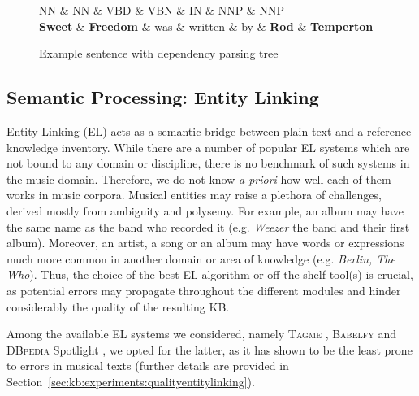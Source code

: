 \begin{figure}[!htb]
\centering
\begin{dependency}
\begin{deptext}[column sep=.0cm]
NN \& NN \& VBD \& VBN \& IN \& NNP \& NNP \\
\textbf{Sweet} \& \textbf{Freedom} \& was \& written \& by \& \textbf{Rod} \& \textbf{Temperton} \\
\end{deptext}




\end{dependency}
\vspace*{-5mm}
\caption{Example sentence with dependency parsing tree}
\label{fig:kb:sampletree}
\end{figure}


\subsection{Semantic Processing: Entity Linking}
\label{sec:kb:method:entitylinking}

Entity Linking (\textsc{EL}) acts as a semantic bridge between plain text and a reference knowledge inventory. While there are a number of popular \textsc{EL} systems which are not bound to any domain or discipline, there is no benchmark of such systems in the music domain. Therefore, we do not know \textit{a priori} how well each of them works in music corpora. Musical entities may raise a plethora of challenges, derived mostly from ambiguity and polysemy. For example, an album may have the same name as the band who recorded it (e.g. \textit{Weezer} the band and their first album). Moreover, an artist, a song or an album may have words or expressions much more common in another domain or area of knowledge (e.g. \textit{Berlin, The Who}). Thus, the choice of the best \textsc{EL} algorithm or off-the-shelf tool(s) is crucial, as potential errors may propagate throughout the different modules and hinder considerably the quality of the resulting \textsc{KB}.

Among the available EL systems we considered, namely \textsc{Tagme} \cite{Ferraginaetal2010}, \textsc{Babelfy} \cite{Moroetal2014} and \textsc{DBpedia} Spotlight \cite{Mendes2011}, we opted for the latter, as it has shown to be the least prone to errors in musical texts (further details are provided in Section~\ref{sec:kb:experiments:qualityentitylinking}).


